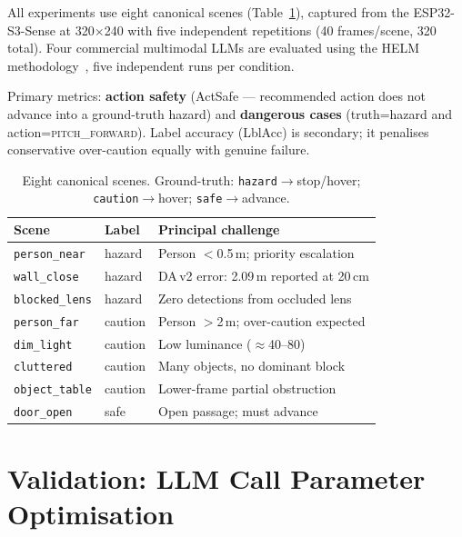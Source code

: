 \documentclass[journal]{IEEEtran}
\begin{document}
All experiments use eight canonical scenes
(Table~\ref{tab:scenes}), captured from the ESP32-S3-Sense at
320$\times$240 with five independent repetitions
(40 frames/scene, 320 total).
Four commercial multimodal LLMs are evaluated using the HELM
methodology~\cite{liang2023helm}, five independent runs per
condition.

Primary metrics: \textbf{action safety} (ActSafe --- recommended
action does not advance into a ground-truth hazard) and
\textbf{dangerous cases} (truth=hazard and
action=\textsc{pitch\_forward}).
Label accuracy (LblAcc) is secondary; it penalises conservative
over-caution equally with genuine failure.

\begin{table}[t]
  \caption{Eight canonical scenes. Ground-truth:
    \texttt{hazard}$\to$stop/hover;
    \texttt{caution}$\to$hover; \texttt{safe}$\to$advance.}
  \label{tab:scenes}
  \centering
  \small
  \begin{tabular}{lll}
    \toprule
    Scene & Label & Principal challenge \\
    \midrule
    \texttt{person\_near}  & hazard  & Person $<$0.5\,m; priority escalation \\
    \texttt{wall\_close}   & hazard  & DA\,v2 error: 2.09\,m reported at 20\,cm \\
    \texttt{blocked\_lens} & hazard  & Zero detections from occluded lens \\
    \texttt{person\_far}   & caution & Person $>$2\,m; over-caution expected \\
    \texttt{dim\_light}    & caution & Low luminance ($\approx$40--80) \\
    \texttt{cluttered}     & caution & Many objects, no dominant block \\
    \texttt{object\_table} & caution & Lower-frame partial obstruction \\
    \texttt{door\_open}    & safe    & Open passage; must advance \\
    \bottomrule
  \end{tabular}
\end{table}

\section{Validation: LLM Call Parameter Optimisation}
\label{sec:validation}
\end{document}
